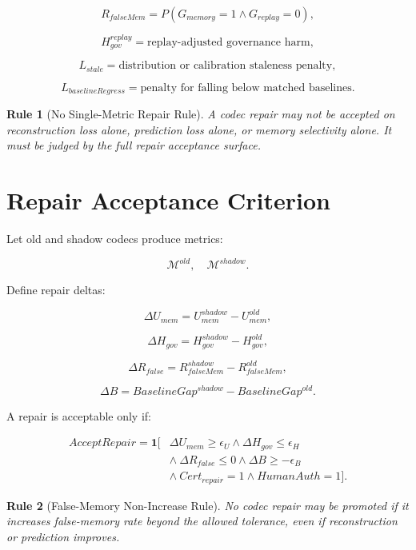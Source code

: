 \documentclass[12pt]{article}
\newtheorem{rulebox}{Rule}
\begin{document}
\[
R_{falseMem}=P(G_{memory}=1\wedge G_{replay}=0),
\]

\[
H^{replay}_{gov}=\text{replay-adjusted governance harm},
\]

\[
L_{stale}=\text{distribution or calibration staleness penalty},
\]

\[
L_{baselineRegress}=\text{penalty for falling below matched baselines}.
\]

\begin{rulebox}[No Single-Metric Repair Rule]
A codec repair may not be accepted on reconstruction loss alone, prediction
loss alone, or memory selectivity alone. It must be judged by the full repair
acceptance surface.
\end{rulebox}

\section{Repair Acceptance Criterion}

Let old and shadow codecs produce metrics:

\[
\mathcal{M}^{old},\quad \mathcal{M}^{shadow}.
\]

Define repair deltas:

\[
\Delta U_{mem}=U_{mem}^{shadow}-U_{mem}^{old},
\]

\[
\Delta H_{gov}=H_{gov}^{shadow}-H_{gov}^{old},
\]

\[
\Delta R_{false}=R_{falseMem}^{shadow}-R_{falseMem}^{old},
\]

\[
\Delta B=BaselineGap^{shadow}-BaselineGap^{old}.
\]

A repair is acceptable only if:

\[
\boxed{
\begin{aligned}
AcceptRepair=\mathbf{1}\big[&\Delta U_{mem}\geq \epsilon_U
\wedge \Delta H_{gov}\leq \epsilon_H\\
&\wedge\ \Delta R_{false}\leq 0
\wedge \Delta B\geq -\epsilon_B\\
&\wedge\ Cert_{repair}=1
\wedge HumanAuth=1\big].
\end{aligned}
}
\]

\begin{rulebox}[False-Memory Non-Increase Rule]
No codec repair may be promoted if it increases false-memory rate beyond the
allowed tolerance, even if reconstruction or prediction improves.
\end{rulebox}
\end{document}

